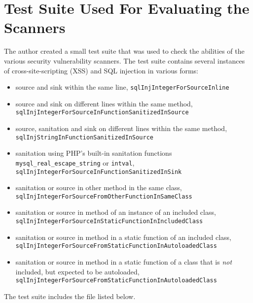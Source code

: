 \chapter{Test Suite Used For Evaluating the Scanners}
\label{testsuite}

The author created a small test suite that was used to check the abilities of the various security vulnerability scanners. The test suite contains several instances of cross-site-scripting (XSS) and SQL injection in various forms:
\begin{itemize}
 \item source and sink within the same line, \eg \texttt{sqlInjIntegerForSourceInline}
 \item source and sink on different lines within the same method, \eg \texttt{sqlInjIntegerForSourceInFunctionSanitizedInSource}
 \item source, sanitation and sink on different lines within the same method, \eg \texttt{sqlInjStringInFunctionSanitizedInSource}
 \item sanitation using PHP's built-in sanitation functions \texttt{mysql\_real\_escape\_string} or \texttt{intval}, \eg \texttt{sqlInjIntegerForSourceInFunctionSanitizedInSink}
 \item sanitation or source in other method in the same class, \eg \texttt{sqlInjIntegerForSourceFromOtherFunctionInSameClass}
 \item sanitation or source in method of an instance of an included class, \eg \texttt{sqlInjIntegerForSourceInStaticFunctionInIncludedClass}
 \item sanitation or source in method in a static function of an included class, \eg \texttt{sqlInjIntegerForSourceFromStaticFunctionInAutoloadedClass}
 \item sanitation or source in method in a static function of a class that is \emph{not} included, but expected to be autoloaded, \eg \texttt{sqlInjIntegerForSourceFromStaticFunctionInAutoloadedClass}
\end{itemize}

The test suite includes the file listed below.



